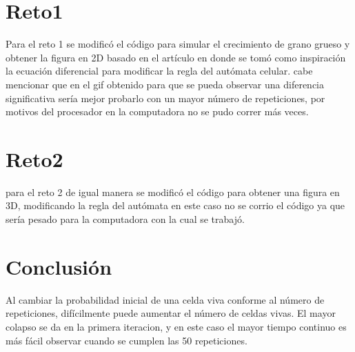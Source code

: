 \documentclass{article}
\begin{document}
\section{Reto1}\label{ret}

Para el reto 1 se modific\'o el c\'odigo para simular el crecimiento de grano grueso y obtener la figura en 2D basado en el art\'iculo \cite{ret1} en donde se tom\'o como inspiraci\'on la ecuaci\'on diferencial para modificar la regla del aut\'omata celular. cabe mencionar que en el gif obtenido \cite{ana1} para que se pueda observar una diferencia significativa ser\'ia mejor probarlo con un mayor n\'umero de repeticiones, por motivos del procesador en la computadora no se pudo correr m\'as veces.

\section{Reto2}\label{reto}

para el reto 2 de igual manera se modific\'o el c\'odigo para obtener una figura en 3D, modificando la regla del aut\'omata en este caso no se corrio el c\'odigo ya que ser\'ia pesado para la computadora con la cual se trabaj\'o.

  \section{Conclusi\'{o}n}\label{con}
 Al cambiar la probabilidad inicial de una celda viva conforme al n\'umero de repeticiones, dif\'icilmente puede aumentar el n\'umero de celdas vivas.
El mayor colapso se da en la primera iteracion, y en este caso el mayor tiempo continuo es m\'as f\'acil observar cuando se cumplen las 50 repeticiones.

  
  
\end{document}
